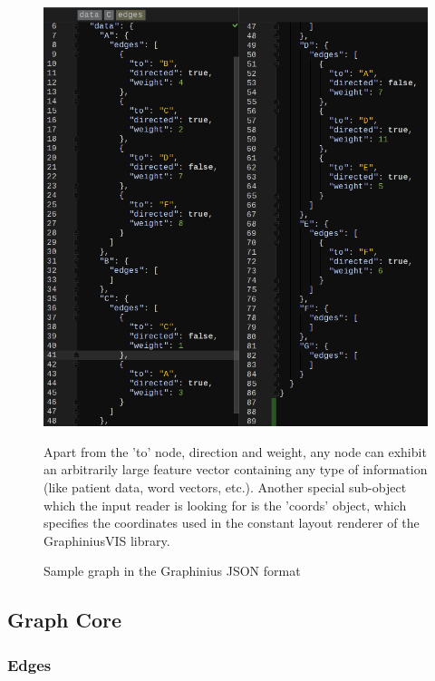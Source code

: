 		\begin{figure}[ht]
			\centering
 			\hspace*{-1.5cm}
			\includegraphics[width=1.2\textwidth]{figures/search_graph_json}
			\caption{Sample graph in the Graphinius JSON format}
			\label{fig:json_input_graph}
			\small Apart from the 'to' node, direction and weight, any node can exhibit an arbitrarily large feature vector containing any type of information (like patient data, word vectors, etc.). Another special sub-object which the input reader is looking for is the 'coords' object, which specifies the coordinates used in the constant layout renderer of the GraphiniusVIS library.
		\end{figure}
		
	
	\subsection{Graph Core}
	\label{ssect:graph_core}
	
		\subsubsection{Edges}
		\label{sssection: core_edges}
		
